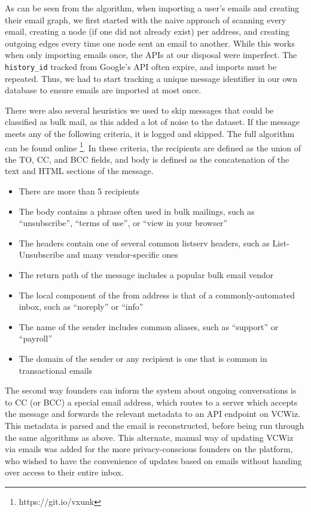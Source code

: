 As can be seen from the algorithm, when importing a user's emails and creating their email graph, we first started with the naive approach of scanning every email, creating a node (if one did not already exist) per address, and creating outgoing edges every time one node sent an email to another. While this works when only importing emails once, the APIs at our disposal were imperfect. The \texttt{history\_id} tracked from Google's API often expire, and imports must be repeated. Thus, we had to start tracking a unique message identifier in our own database to ensure emails are imported at most once.

There were also several heuristics we used to skip messages that could be classified as bulk mail, as this added a lot of noise to the dataset. If the message meets any of the following criteria, it is logged and skipped. The full algorithm can be found online \footnote{https://git.io/vxunk}. In these criteria, the recipients are defined as the union of the TO, CC, and BCC fields, and body is defined as the concatenation of the text and HTML sections of the message.

\begin{itemize}
  \item There are more than 5 recipients
  \item The body contains a phrase often used in bulk mailings, such as ``unsubscribe'', ``terms of use'', or ``view in your browser''
  \item The headers contain one of several common listserv headers, such as List-Unsubscribe and many vendor-specific ones
  \item The return path of the message includes a popular bulk email vendor
  \item The local component of the from address is that of a commonly-automated inbox, such as ``noreply'' or ``info''
  \item The name of the sender includes common aliases, such as ``support'' or ``payroll''
  \item The domain of the sender or any recipient is one that is common in transactional emails
\end{itemize}

The second way founders can inform the system about ongoing conversations is to CC (or BCC) a special email address, which routes to a server which accepts the message and forwards the relevant metadata to an API endpoint on VCWiz. This metadata is parsed and the email is reconstructed, before being run through the same algorithms as above. This alternate, manual way of updating VCWiz via emails was added for the more privacy-conscious founders on the platform, who wished to have the convenience of updates based on emails without handing over access to their entire inbox.

